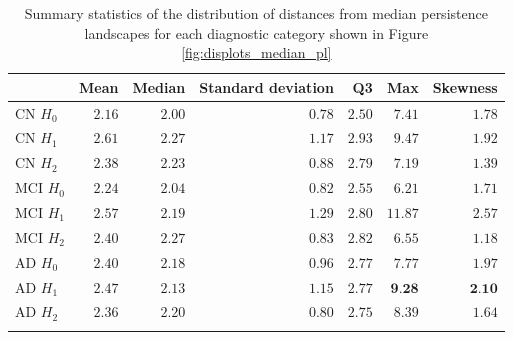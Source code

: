 \documentclass{article}
\begin{document}
\begin{table}
\centering
\begin{tabular}{lrrrrrr}
\toprule
{} &  Mean &  Median &  Standard deviation &   Q3 &   Max &  Skewness \\
\midrule
CN $H_0$ & $2.16$ & $2.00$ & $0.78$ & $2.50$ & $7.41$ & $1.78$ \\
CN $H_1$ & $2.61$ & $2.27$ & $1.17$ & $2.93$ & $9.47$ & $1.92$ \\
CN $H_2$ & $2.38$ & $2.23$ & $0.88$ & $2.79$ & $7.19$ & $1.39$ \\
MCI $H_0$ & $2.24$ & $2.04$ & $0.82$ & $2.55$ & $6.21$ & $1.71$ \\
MCI $H_1$ & $2.57$ & $2.19$ & $1.29$ & $2.80$ & $\mathbf{11.87}$ & $\mathbf{2.57}$ \\
MCI $H_2$ & $2.40$ & $2.27$ & $0.83$ & $2.82$ & $6.55$ & $1.18$ \\
AD $H_0$ & $2.40$ & $2.18$ & $0.96$ & $2.77$ & $7.77$ & $1.97$ \\
AD $H_1$ & $2.47$ & $2.13$ & $1.15$ & $2.77$ & $\textbf{9.28}$ & $\textbf{2.10}$ \\
AD $H_2$ & $2.36$ & $2.20$ & $0.80$ & $2.75$ & $8.39$ & $1.64$ \\
  \bottomrule
  \vspace{1pt}
\end{tabular}
\caption{Summary statistics of the distribution of distances from median persistence landscapes for each diagnostic category shown in Figure \ref{fig:displots_median_pl}}
\label{tab:stats_median_pl}
\end{table}
\end{document}
